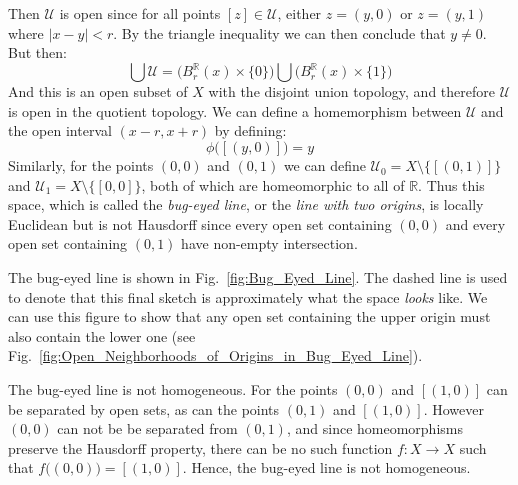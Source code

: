 \documentclass{article}                                                        %
\begin{document}
\begin{example}
\begin{equation}
                \end{equation}
                Then $\mathcal{U}$ is open since for all points
                $[z]\in\mathcal{U}$, either $z=(y,0)$ or $z=(y,1)$ where
                $|x-y|<r$. By the triangle inequality we can then conclude that
                $y\ne{0}$. But then:
                \begin{equation}
                    \bigcup\mathcal{U}=\Big(B_{r}^{\mathbb{R}}(x)\times\{0\}\Big)
                        \bigcup\Big(B_{r}^{\mathbb{R}}(x)\times\{1\}\Big)
                \end{equation}
                And this is an open subset of $X$ with the disjoint union
                topology, and therefore $\mathcal{U}$ is open in the quotient
                topology. We can define a homemorphism between $\mathcal{U}$ and
                the open interval $(x-r,x+r)$ by defining:
                \begin{equation}
                    \phi\big([(y,0)]\big)=y
                \end{equation}
                Similarly, for the points $(0,0)$ and $(0,1)$ we can define
                $\mathcal{U}_{0}=X\setminus\{[(0,1)]\}$ and
                $\mathcal{U}_{1}=X\setminus\{[0,0]\}$, both of which are
                homeomorphic to all of $\mathbb{R}$. Thus this space, which is
                called the \textit{bug-eyed line}, or the
                \textit{line with two origins}, is
                locally Euclidean but is not Hausdorff since every open set
                containing $(0,0)$ and every open set containing $(0,1)$ have
                non-empty intersection.
        \end{example}
        The bug-eyed line is shown in
        Fig.~\ref{fig:Bug_Eyed_Line}. The dashed line is used to denote that
        this final sketch is approximately what the space \textit{looks}
        like. We can use this figure to show that any open set containing
        the upper origin must also contain the lower one
        (see Fig.~\ref{fig:Open_Neighborhoods_of_Origins_in_Bug_Eyed_Line}).
        \begin{example}
                The bug-eyed line is not homogeneous. For the points $(0,0)$ and
                $[(1,0)]$ can be separated by open sets, as can the points
                $(0,1)$ and $[(1,0)]$. However $(0,0)$ can not be be separated
                from $(0,1)$, and since homeomorphisms preserve the Hausdorff
                property, there can be no such function $f:X\rightarrow{X}$ such
                that $f\big((0,0)\big)=[(1,0)]$. Hence, the bug-eyed line is
                not homogeneous.
        \end{example}
\end{document}
